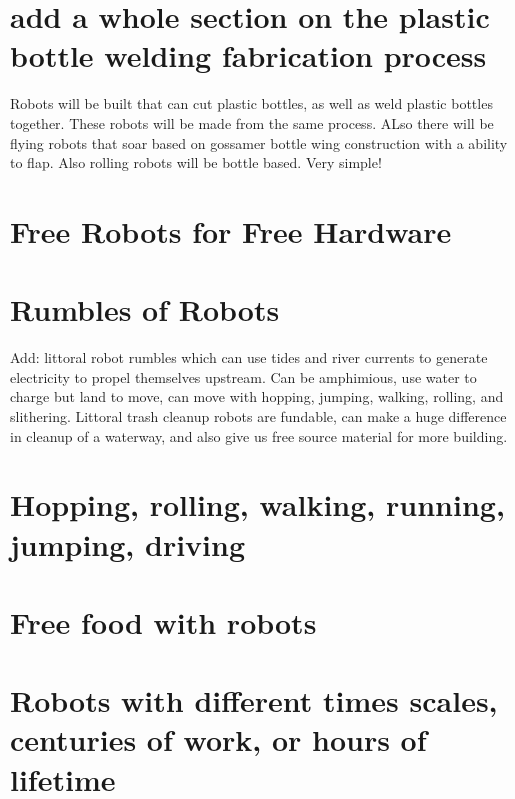 \section{add a whole section on the plastic bottle welding fabrication
process}\label{add-a-whole-section-on-the-plastic-bottle-welding-fabrication-process}

Robots will be built that can cut plastic bottles, as well as weld
plastic bottles together. These robots will be made from the same
process. ALso there will be flying robots that soar based on gossamer
bottle wing construction with a ability to flap. Also rolling robots
will be bottle based. Very simple!

\section{Free Robots for Free
Hardware}\label{free-robots-for-free-hardware}

\section{Rumbles of Robots}\label{rumbles-of-robots}

Add: littoral robot rumbles which can use tides and river currents to
generate electricity to propel themselves upstream. Can be amphimious,
use water to charge but land to move, can move with hopping, jumping,
walking, rolling, and slithering. Littoral trash cleanup robots are
fundable, can make a huge difference in cleanup of a waterway, and also
give us free source material for more building.

\section{Hopping, rolling, walking, running, jumping,
driving}\label{hopping-rolling-walking-running-jumping-driving}

\section{Free food with robots}\label{free-food-with-robots}

\section{Robots with different times scales, centuries of work, or hours
of
lifetime}\label{robots-with-different-times-scales-centuries-of-work-or-hours-of-lifetime}


